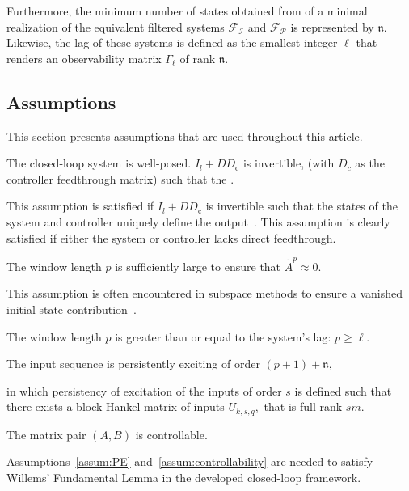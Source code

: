 Furthermore, the minimum number of states obtained from of a minimal realization of the equivalent filtered systems $\mathcal{F}_\mathcal{I}$ and $\mathcal{F}_\mathcal{P}$ is represented by $\mathfrak{n}$. Likewise, the lag of these systems is defined as the smallest integer $\ell$ that renders an observability matrix $\Gamma_\ell$ of rank $\mathfrak{n}$.

\subsection{Assumptions}
This section presents assumptions that are used throughout this article.
\begin{assum}\label{assum:well_posed}
    The closed-loop system is well-posed. $I_l+DD_\mathrm{c}$ is invertible, (with $D_c$ as the controller feedthrough matrix) such that the .
\end{assum}
This assumption is satisfied if $I_l+DD_\mathrm{c}$ is invertible such that the states of the system and controller uniquely define the output~\cite{VanOverschee1997}. This assumption is clearly satisfied if either the system or controller lacks direct feedthrough.
\begin{assum}\label{assum:initial_contribution}
    The window length $p$ is sufficiently large to ensure that $\tilde{A}^p\approx0$.
\end{assum}
This assumption is often encountered in subspace methods to ensure a vanished initial state contribution~\citep{Chiuso2007}.
\begin{assum}\label{assum:unique_initial}
    The window length $p$ is greater than or equal to the system's lag: $p\geq\ell$.
\end{assum}
\begin{assum}\label{assum:PE}
    The input sequence is persistently exciting of order $(p+1)+\mathfrak{n},$
\end{assum}
in which persistency of excitation of the inputs of order $s$ is defined such that there exists a block-Hankel matrix of inputs $U_{k,s,q},$ that is full rank $sm$.
\begin{assum}\label{assum:controllability}
    The matrix pair $(A,B)$ is controllable.
\end{assum}
Assumptions~\ref{assum:PE} and~\ref{assum:controllability} are needed to satisfy Willems' Fundamental Lemma in the developed closed-loop framework.